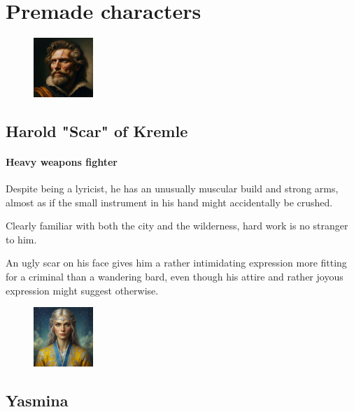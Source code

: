 \documentclass[10pt,onecolumn,twoside,openany,bg=full,layout=true]{dndbook}
\begin{document}
\section{Premade characters}\label{sec:premade-characters}
  \begin{figure}
    \begin{center}
      \includegraphics[width=0.2\textwidth]{img/characters/harold}
    \end{center}
  \end{figure}
  \subsection {Harold "Scar" of Kremle}\label{subsec:harold-"scar"-of-kremle}
\paragraph{Heavy weapons fighter}
Despite being a lyricist, he has an unusually muscular build and strong arms, almost as if the small instrument in his
hand might accidentally be crushed.\par
Clearly familiar with both the city and the wilderness, hard work is no stranger to him.\par
An ugly scar on his face gives him a rather intimidating expression more fitting for a criminal than a wandering bard,
even though his attire and rather joyous expression might suggest otherwise.

  \begin{figure}
    \begin{center}
      \includegraphics[width=0.2\textwidth]{img/characters/yasmina}
    \end{center}
  \end{figure}
  \subsection{Yasmina}\label{subsec:yasmina}
\end{document}
